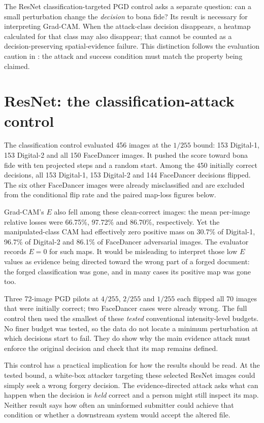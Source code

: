 The ResNet classification-targeted PGD control asks a separate question: can a small perturbation change the \emph{decision} to bona fide? Its result is necessary for interpreting Grad-CAM. When the attack-class decision disappears, a heatmap calculated for that class may also disappear; that cannot be counted as a decision-preserving spatial-evidence failure. This distinction follows the evaluation caution in \citet{carlini2019evaluating}: the attack and success condition must match the property being claimed.

\section{ResNet: the classification-attack control}
\label{sec:adv-resnet-control}

The classification control evaluated 456 images at the $1/255$ bound: 153 Digital-1, 153 Digital-2 and all 150 FaceDancer images. It pushed the score toward bona fide with ten projected steps and a random start. Among the 450 initially correct decisions, all 153 Digital-1, 153 Digital-2 and 144 FaceDancer decisions flipped. The six other FaceDancer images were already misclassified and are excluded from the conditional flip rate and the paired map-loss figures below.

Grad-CAM's $E$ also fell among these clean-correct images: the mean per-image relative losses were 66.75\%, 97.72\% and 86.70\%, respectively. Yet the manipulated-class CAM had effectively zero positive mass on 30.7\% of Digital-1, 96.7\% of Digital-2 and 86.1\% of FaceDancer adversarial images. The evaluator records $E=0$ for such maps. It would be misleading to interpret those low $E$ values as evidence being directed toward the wrong part of a forged document: the forged classification was gone, and in many cases its positive map was gone too.

Three 72-image PGD pilots at $4/255$, $2/255$ and $1/255$ each flipped all 70 images that were initially correct; two FaceDancer cases were already wrong. The full control then used the smallest of these \emph{tested} conventional intensity-level budgets. No finer budget was tested, so the data do not locate a minimum perturbation at which decisions start to fail. They do show why the main evidence attack must enforce the original decision and check that its map remains defined.

This control has a practical implication for how the results should be read. At the tested bound, a white-box attacker targeting these selected ResNet images could simply seek a wrong forgery decision. The evidence-directed attack asks what can happen when the decision is \emph{held} correct and a person might still inspect its map. Neither result says how often an uninformed submitter could achieve that condition or whether a downstream system would accept the altered file.

